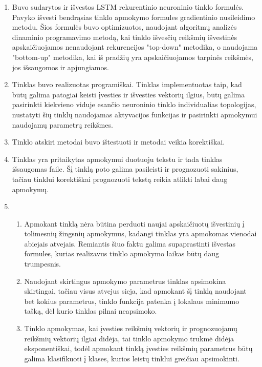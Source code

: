 \begin{enumerate}
  \item Buvo sudarytos ir išvestos LSTM rekurentinio neuroninio tinklo formulės. Pavyko išvesti bendrąsias tinklo apmokymo formules gradientinio nusileidimo metodu. Šios formulės buvo optimizuotos, naudojant algoritmų analizės dinaminio programavimo metodą, kai tinklo išvesčių reikšmių išvestinės apskaičiuojamos nenaudojant rekurencijos "top-down" metodika, o naudojama "bottom-up" metodika, kai iš pradžių yra apskaičiuojamos tarpinės reikšmės, jos išsaugomos ir apjungiamos.
  \item Tinklas buvo realizuotas programiškai. Tinklas implementuotas taip, kad būtų galima patogiai keisti įvesties ir išvesties vektorių ilgius, būtų galima pasirinkti kiekvieno viduje esančio neuroninio tinklo individualias topologijas, nustatyti šių tinklų naudojamas aktyvacijos funkcijas ir pasirinkti apmokymui naudojamų parametrų reikšmes.
  \item Tinklo atskiri metodai buvo ištestuoti ir metodai veikia korektiškai.
  \item Tinklas yra pritaikytas apmokymui duotuoju tekstu ir tada tinklas išsaugomas faile. Šį tinklą poto galima pasileisti ir prognozuoti sakinius, tačiau tinklui korektiškai prognozuoti tekstą reikia atlikti labai daug apmokymų.
  \item
  \begin{enumerate}
    \item Apmokant tinklą nėra būtina perduoti naujai apskaičiuotų išvestinių į tolimesnių žingsnių apmokymus, kadangi tinklas yra apmokomas vienodai abiejais atvejais. Remiantis šiuo faktu galima supaprastinti išvestas formules, kurias realizavus tinklo apmokymo laikas būtų daug trumpesnis.
    \item Naudojant skirtingus apmokymo parametrus tinklas apsimokina skirtingai, tačiau visus atvejus sieja, kad apmokant šį tinklą naudojant bet kokius parametrus, tinklo funkcija patenka į lokalaus minimumo tašką, dėl kurio tinklas pilnai neapsimoko.
    \item Tinklo apmokymas, kai įvesties reikšmių vektorių ir prognozuojamų reikšmių vektorių ilgiai didėja, tai tinklo apmokymo trukmė didėja eksponentiškai, todėl apmokant tinklą įvesties reikšmių parametrus būtų galima klasifikuoti į klases, kurios leistų tinklui greičiau apsimokinti.
  \end{enumerate}
\end{enumerate}
